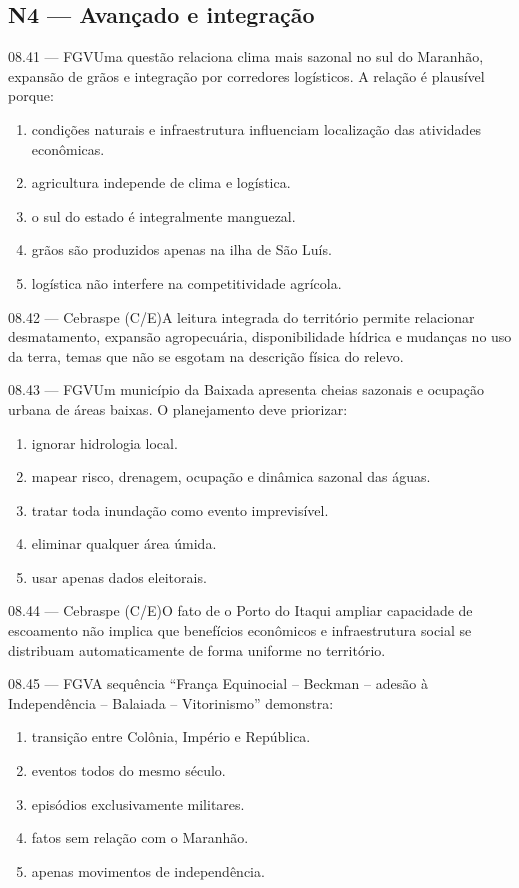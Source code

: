 \subsection*{N4 — Avançado e integração}
\begin{questao}{ 08.41 — FGV}Uma questão relaciona clima mais sazonal no sul do Maranhão, expansão de grãos e integração por corredores logísticos. A relação é plausível porque:\begin{enumerate}[label=\Alph*)]\item condições naturais e infraestrutura influenciam localização das atividades econômicas.\item agricultura independe de clima e logística.\item o sul do estado é integralmente manguezal.\item grãos são produzidos apenas na ilha de São Luís.\item logística não interfere na competitividade agrícola.\end{enumerate}\end{questao}
\begin{questao}{ 08.42 — Cebraspe (C/E)}A leitura integrada do território permite relacionar desmatamento, expansão agropecuária, disponibilidade hídrica e mudanças no uso da terra, temas que não se esgotam na descrição física do relevo.\end{questao}
\begin{questao}{ 08.43 — FGV}Um município da Baixada apresenta cheias sazonais e ocupação urbana de áreas baixas. O planejamento deve priorizar:\begin{enumerate}[label=\Alph*)]\item ignorar hidrologia local.\item mapear risco, drenagem, ocupação e dinâmica sazonal das águas.\item tratar toda inundação como evento imprevisível.\item eliminar qualquer área úmida.\item usar apenas dados eleitorais.\end{enumerate}\end{questao}
\begin{questao}{ 08.44 — Cebraspe (C/E)}O fato de o Porto do Itaqui ampliar capacidade de escoamento não implica que benefícios econômicos e infraestrutura social se distribuam automaticamente de forma uniforme no território.\end{questao}
\begin{questao}{ 08.45 — FGV}A sequência “França Equinocial -- Beckman -- adesão à Independência -- Balaiada -- Vitorinismo” demonstra:\begin{enumerate}[label=\Alph*)]\item transição entre Colônia, Império e República.\item eventos todos do mesmo século.\item episódios exclusivamente militares.\item fatos sem relação com o Maranhão.\item apenas movimentos de independência.\end{enumerate}\end{questao}
